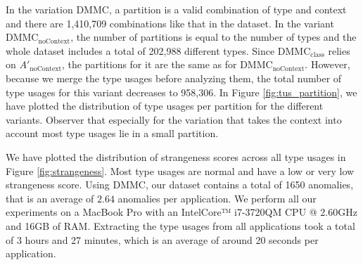 In the variation $\text{DMMC}$, a partition is a valid combination of type and context and there are 1,410,709 combinations like that in the dataset.
In the variant $\text{DMMC}_{\text{noContext}}$, the number of partitions is equal to the number of types and the whole dataset includes a total of 202,988 different types.
Since $\text{DMMC}_{\text{class}}$ relies on $A'_\text{noContext}$, the partitions for it are the same as for $\text{DMMC}_{\text{noContext}}$.
However, because we merge the type usages before analyzing them, the total number of type usages for this variant decreases to 958,306.
In Figure \ref{fig:tus_partition}, we have plotted the distribution of type usages per partition for the different variants.
Observer that especially for the variation that takes the context into account most type usages lie in a small partition.

We have plotted the distribution of strangeness scores across all type usages in Figure \ref{fig:strangeness}.
Most type usages are normal and have a low or very low strangeness score.
Using $\text{DMMC}$, our dataset contains a total of 1650 anomalies, that is an average of $2.64$ anomalies per application.
We perform all our experiments on a MacBook Pro with an Intel\textregistered Core™ i7-3720QM CPU @ 2.60GHz and 16GB of RAM\@.
Extracting the type usages from all applications took a total of 3 hours and 27 minutes, which is an average of around 20 seconds per application.

